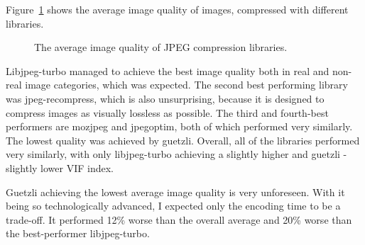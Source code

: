 \documentclass[12pt]{article}
\begin{document}
Figure~\ref{avgImageQuality} shows the average image quality of images, compressed with different libraries.
\begin{figure}[H]
	\caption{The average image quality of JPEG compression libraries.}
	\label{avgImageQuality}
\end{figure}
Libjpeg-turbo managed to achieve the best image quality both in real and non-real image categories, which was expected. The second best performing library was jpeg-recompress, which is also unsurprising, because it is designed to compress images as visually lossless as possible. The third and fourth-best performers are mozjpeg and jpegoptim, both of which performed very similarly. The lowest quality was achieved by guetzli. Overall, all of the libraries performed very similarly, with only libjpeg-turbo achieving a slightly higher and guetzli - slightly lower VIF index.

Guetzli achieving the lowest average image quality is very unforeseen. With it being so technologically advanced, I expected only the encoding time to be a trade-off. It performed 12\% worse than the overall average and 20\% worse than the best-performer libjpeg-turbo.
\end{document}
